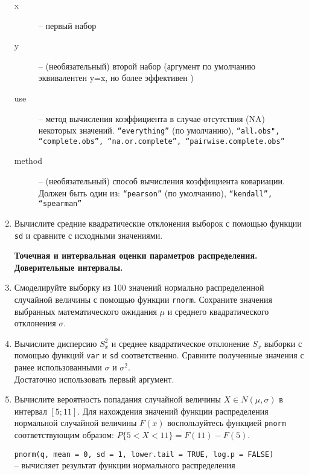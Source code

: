 \begin{enumerate}
\begin{mdframed}[style=BadassFrame]
\begin{description}
                \item[x] -- первый набор
                \item[y] -- (необязательный) второй набор (аргумент по умолчанию эквивалентен y=x, но более эффективен )
                \item[use] -- метод вычисления коэффициента в случае отсутствия (NA) некоторых значений.
                     \texttt{``everything''} (по умолчанию),  \texttt{``all.obs", ``complete.obs'', ``na.or.complete'', ``pairwise.complete.obs''}
                \item[method] -- (необязательный) способ вычисления коэффициента ковариации. Должен быть один из: 
                     \texttt{``pearson''} (по умолчанию), \texttt{``kendall'', ``spearman''}
              \end{description}
          \end{mdframed}

    \item Вычислите средние квадратические отклонения выборок с помощью функции \texttt{sd} и сравните
          с исходными значениями.


    \textbf{Точечная и интервальная оценки параметров распределения. Доверительные интервалы.}

    \item Смоделируйте выборку из 100 значений нормально распределенной случайной величины с помощью
          функции \texttt{rnorm}. Сохраните значения выбранных математического ожидания $\mu$ и 
          среднего квадратического отклонения $\sigma$.

    \item Вычислите дисперсию $S_x^2$ и среднее квадратическое отклонение $S_x$ выборки с помощью 
          функций \texttt{var} и \texttt{sd} соответственно. Сравните полученные значения с ранее использованными 
          $\sigma$ и $\sigma^2$. \\
          Достаточно использовать первый аргумент.

    \item Вычислите вероятность попадания случайной величины $X \in N(\mu, \sigma)$ в интервал $[5;11]$. Для нахождения значений функции распределения
          нормальной случайной величины $F(x)$ воспользуйтесь функцией \texttt{pnorm} соответствующим образом: $P\{5<X<11\}=F(11)-F(5)$.

          \begin{mdframed}[style=BadassFrame]

              \texttt{pnorm(q, mean = 0, sd = 1, lower.tail = TRUE, log.p = FALSE)} \\
                -- вычисляет результат функции нормального распределения
              \begin{description}


\end{description}
\end{mdframed}
\end{enumerate}
